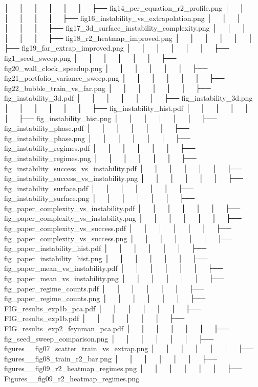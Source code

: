 │   │       │   │       │   │   ├── fig14_per_equation_r2_profile.png
│   │       │   │       │   │   ├── fig16_instability_vs_extrapolation.png
│   │       │   │       │   │   ├── fig17_3d_surface_instability_complexity.png
│   │       │   │       │   │   ├── fig18_r2_heatmap_improved.png
│   │       │   │       │   │   ├── fig19_far_extrap_improved.png
│   │       │   │       │   │   ├── fig1_seed_sweep.png
│   │       │   │       │   │   ├── fig20_wall_clock_speedup.png
│   │       │   │       │   │   ├── fig21_portfolio_variance_sweep.png
│   │       │   │       │   │   ├── fig22_bubble_train_vs_far.png
│   │       │   │       │   │   ├── fig_instability_3d.pdf
│   │       │   │       │   │   ├── fig_instability_3d.png
│   │       │   │       │   │   ├── fig_instability_hist.pdf
│   │       │   │       │   │   ├── fig_instability_hist.png
│   │       │   │       │   │   ├── fig_instability_phase.pdf
│   │       │   │       │   │   ├── fig_instability_phase.png
│   │       │   │       │   │   ├── fig_instability_regimes.pdf
│   │       │   │       │   │   ├── fig_instability_regimes.png
│   │       │   │       │   │   ├── fig_instability_success_vs_instability.pdf
│   │       │   │       │   │   ├── fig_instability_success_vs_instability.png
│   │       │   │       │   │   ├── fig_instability_surface.pdf
│   │       │   │       │   │   ├── fig_instability_surface.png
│   │       │   │       │   │   ├── fig_paper_complexity_vs_instability.pdf
│   │       │   │       │   │   ├── fig_paper_complexity_vs_instability.png
│   │       │   │       │   │   ├── fig_paper_complexity_vs_success.pdf
│   │       │   │       │   │   ├── fig_paper_complexity_vs_success.png
│   │       │   │       │   │   ├── fig_paper_instability_hist.pdf
│   │       │   │       │   │   ├── fig_paper_instability_hist.png
│   │       │   │       │   │   ├── fig_paper_mean_vs_instability.pdf
│   │       │   │       │   │   ├── fig_paper_mean_vs_instability.png
│   │       │   │       │   │   ├── fig_paper_regime_counts.pdf
│   │       │   │       │   │   ├── fig_paper_regime_counts.png
│   │       │   │       │   │   ├── FIG_results_exp1b_pca.pdf
│   │       │   │       │   │   ├── FIG_results_exp1b.pdf
│   │       │   │       │   │   ├── FIG_results_exp2_feynman_pca.pdf
│   │       │   │       │   │   ├── fig_seed_sweep_comparison.png
│   │       │   │       │   │   ├── figures__fig07_scatter_train_vs_extrap.png
│   │       │   │       │   │   ├── figures__fig08_train_r2_bar.png
│   │       │   │       │   │   ├── figures__fig09_r2_heatmap_regimes.png
│   │       │   │       │   │   ├── Figures__fig09_r2_heatmap_regimes.png
